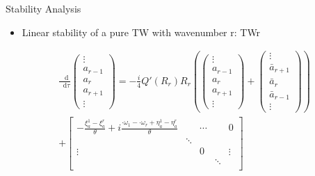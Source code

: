 \documentclass[dvipsnames, aspectratio = 169]{beamer}
\newcommand*\df{\mathop{}\!\mathrm{d}}
\begin{document}
\begin{frame}{Stability Analysis}
	\begin{itemize}
		\item Linear stability of a pure TW with wavenumber r: TWr
	\end{itemize}
	\begin{equation}\label{eq:tuned_TW_Basis_linear}
		\begin{split}
			&\frac{\df}{\df \tau}\begin{pmatrix}
				\vdots  \\
				a_{r-1} \\
				a_r     \\
				a_{r+1} \\
				\vdots
			\end{pmatrix}= -\frac{i}{4}Q'(R_r)R_r \left(\begin{pmatrix}
					\vdots  \\
					a_{r-1} \\
					a_r     \\
					a_{r+1} \\
					\vdots
				\end{pmatrix} + \begin{pmatrix}
					\vdots        \\
					\bar{a}_{r+1} \\
					\bar{a}_{r}   \\
					\bar{a}_{r-1} \\
					\vdots
				\end{pmatrix}\right)\\
			&+\begin{bmatrix}
				-\frac{\xi_a^1 - \xi_a^r}{\theta} + i\frac{·\omega_1 - ·\omega_r + \eta_a^1-\eta_a^r}{\theta} &        & \cdots &        & 0                                                                                             \\
				                                                                                              & \ddots &        &        &                                                                                               \\
				\vdots                                                                                        &        & 0      &        & \vdots                                                                                        \\
				                                                                                              &        &        & \ddots &                                                                                               \\

\end{bmatrix}
\end{split}
\end{equation}
\end{frame}
\end{document}
